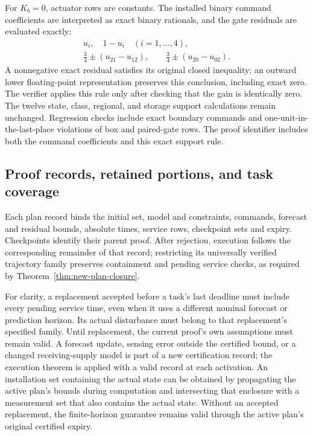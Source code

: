 For $K_b=0$, actuator rows are constants. The installed binary command
coefficients are interpreted as exact binary rationals, and the gate
residuals are evaluated exactly:
\begin{equation}
 \begin{gathered}
 u_i,\quad 1-u_i\quad(i=1,\ldots,4),\\
 \tfrac34\pm(u_{21}-u_{12}),\qquad
 \tfrac34\pm(u_{20}-u_{02}).
 \end{gathered}
 \label{eq:new-exact-actuator-residuals}
\end{equation}
A nonnegative exact residual satisfies its original closed inequality;
an outward lower floating-point representation preserves this conclusion,
including exact zero. The verifier applies this rule only after checking
that the gain is identically zero. The twelve state, class, regional, and
storage support calculations remain unchanged. Regression checks
include exact boundary commands and one-unit-in-the-last-place violations
of box and paired-gate rows. The proof identifier includes both the command
coefficients and this exact support rule.

\subsection{Proof records, retained portions, and task coverage}

Each plan record binds the initial set, model and constraints, commands,
forecast and residual bounds, absolute times, service rows, checkpoint sets
and expiry. Checkpoints identify their parent proof. After rejection,
execution follows the corresponding remainder of that record; restricting
its universally verified trajectory family preserves containment and
pending service checks, as required by Theorem~\ref{thm:new-plan-closure}.

For clarity, a replacement accepted before a task's last deadline must
include every pending service time, even when it uses a different nominal
forecast or prediction horizon. Its actual disturbance must belong to that
replacement's specified family. Until replacement, the current proof's own
assumptions must remain valid. A forecast update, sensing error outside the
certified bound, or a changed receiving-supply model is part of a new
certification record; the execution theorem is applied with a valid record
at each activation. An installation set containing the actual state can be obtained by
propagating the active plan's bounds during computation and intersecting
that enclosure with a measurement set that also contains the actual state. Without an accepted replacement, the finite-horizon guarantee remains
valid through the active plan's original certified expiry.

